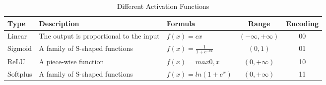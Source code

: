 \begin{table*}[!t]
\centering
\caption{Different Activation Functions}
\label{tab:active_function}
\begin{adjustbox}{width=0.9\textwidth}
\label{tab:transfer_function}
	\begin{tabular}{lllcc}
			\toprule
			Type & Description  & Formula & Range              & Encoding\\
			\midrule
			Linear   & The output is proportional to the input & $f(x)=cx$                  &  $(-\infty, +\infty)$ & 00\\
			Sigmoid  & A family of S-shaped functions          & $f(x)=\frac{1}{1+e^{-cx}}$ & $(0, 1)$              & 01\\
			ReLU     & A piece-wise function                   & $f(x)= max{0,x}$           & $(0, +\infty)$        & 10\\
			Softplus & A family of S-shaped functions          & $f(x) = ln(1+e^x)$         & $(0, +\infty)$        & 11\\
			\bottomrule
	\end{tabular}
\end{adjustbox}
\end{table*}
